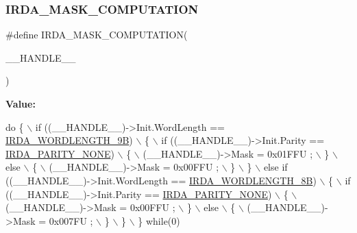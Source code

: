 \subsubsection{\texorpdfstring{I\+R\+D\+A\+\_\+\+M\+A\+S\+K\+\_\+\+C\+O\+M\+P\+U\+T\+A\+T\+I\+ON}{IRDA\_MASK\_COMPUTATION}}
{\footnotesize\ttfamily \#define I\+R\+D\+A\+\_\+\+M\+A\+S\+K\+\_\+\+C\+O\+M\+P\+U\+T\+A\+T\+I\+ON(\begin{DoxyParamCaption}\item[{}]{\+\_\+\+\_\+\+H\+A\+N\+D\+L\+E\+\_\+\+\_\+ }\end{DoxyParamCaption})}

{\bfseries Value\+:}
\begin{DoxyCode}
\textcolor{keywordflow}{do} \{                                                                \(\backslash\)
  if ((\_\_HANDLE\_\_)->Init.WordLength == \hyperlink{group___i_r_d_a_ex___word___length_gad005e4d28476758d4e5b56a3d98f7cd4}{IRDA\_WORDLENGTH\_9B})            \(\backslash\)
  \{                                                                   \(\backslash\)
     if ((\_\_HANDLE\_\_)->Init.Parity == \hyperlink{group___i_r_d_a___parity_ga930d90dc494068f6e8fd34c2008af6c3}{IRDA\_PARITY\_NONE})               \(\backslash\)
     \{                                                                \(\backslash\)
        (\_\_HANDLE\_\_)->Mask = 0x01FFU ;                                \(\backslash\)
     \}                                                                \(\backslash\)
     else                                                             \(\backslash\)
     \{                                                                \(\backslash\)
        (\_\_HANDLE\_\_)->Mask = 0x00FFU ;                                \(\backslash\)
     \}                                                                \(\backslash\)
  \}                                                                   \(\backslash\)
  else \textcolor{keywordflow}{if} ((\_\_HANDLE\_\_)->Init.WordLength == \hyperlink{group___i_r_d_a_ex___word___length_ga53b28028ae932349fcc40190dd8d7c9a}{IRDA\_WORDLENGTH\_8B})       \(\backslash\)
  \{                                                                   \(\backslash\)
     if ((\_\_HANDLE\_\_)->Init.Parity == \hyperlink{group___i_r_d_a___parity_ga930d90dc494068f6e8fd34c2008af6c3}{IRDA\_PARITY\_NONE})               \(\backslash\)
     \{                                                                \(\backslash\)
        (\_\_HANDLE\_\_)->Mask = 0x00FFU ;                                \(\backslash\)
     \}                                                                \(\backslash\)
     else                                                             \(\backslash\)
     \{                                                                \(\backslash\)
        (\_\_HANDLE\_\_)->Mask = 0x007FU ;                                \(\backslash\)
     \}                                                                \(\backslash\)
  \}                                                                   \(\backslash\)
\} \textcolor{keywordflow}{while}(0)
\end{DoxyCode}


